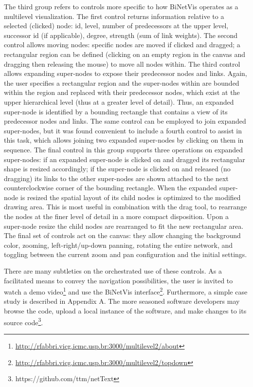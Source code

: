 \documentclass[runningheads]{llncs}
\begin{document}
The third group refers to controls more specific to how BiNetVis operates as a multilevel visualization. 
The first control returns information relative to a selected (clicked) node:
id, level, number of predecessors at the upper level, successor id (if applicable), degree, strength (sum of link weights).
The second control allows moving nodes: specific nodes are moved if clicked and dragged; a rectangular region can be defined (clicking on an empty region in the canvas and dragging then releasing the mouse) to move all nodes within. The third control allows expanding super-nodes to expose their predecessor nodes and links. Again, the user specifies a rectangular region and the super-nodes within are bounded within the region and replaced with their predecessor nodes, which exist at the upper hierarchical level (thus at a greater level of detail). Thus, an expanded super-node is identified by a bounding rectangle that contains a view of its predecessor nodes and links.
The same control can be employed to join expanded super-nodes, but it was found convenient to include a fourth control to assist in this task, which allows joining two expanded super-nodes by clicking on them in sequence.
The final control in this group supports three operations on expanded super-nodes:
if an expanded super-node is clicked on and dragged its rectangular shape is resized accordingly;
if the super-node is clicked on and released (no dragging) its links  to the other super-nodes are shown attached to the next counterclockwise corner of the bounding rectangle.
When the expanded super-node is resized the spatial layout of its child nodes is optimized to the modified drawing area. This is most useful in combination with the drag tool, to rearrange the nodes at the finer level of detail in a more compact disposition.
Upon a super-node resize the child nodes are rearranged to fit the new rectangular area.
The final set of controls act on the canvas: they allow
changing the background color, zooming, left-right/up-down panning,
rotating the entire network, and toggling between the current zoom and pan configuration and the initial settings.

\noindent There are many subtleties on the orchestrated use of these controls.
As a facilitated means to convey the navigation possibilities, the user is invited to watch a demo video\footnote{\url{http://rfabbri.vicg.icmc.usp.br:3000/multilevel2/about}} %
and use the BiNetVis interface\footnote{\url{http://rfabbri.vicg.icmc.usp.br:3000/multilevel2/topdown}}.
Furthermore, a simple case study is described in Appendix A.
The more seasoned software developers may browse the code, upload a local instance of the software, and make changes to its source code\footnote{ https://github.com/ttm/netText}.
\end{document}
